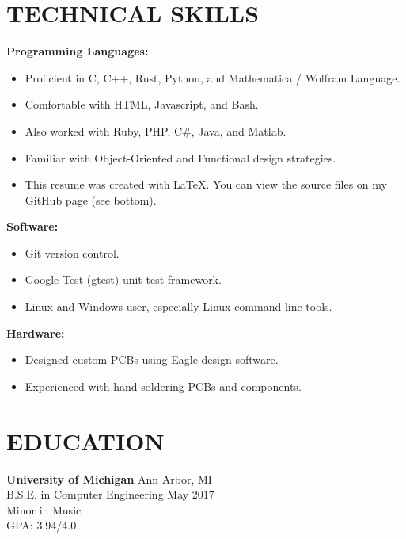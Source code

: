 \documentclass[margin,11pt]{res}
\begin{document}
\begin{resume}
\section{TECHNICAL SKILLS}
\textbf{Programming Languages:}\\
\vspace{-10pt}
\begin{itemize}
    \itemsep -2pt
    \item Proficient in C, C++, Rust, Python, and Mathematica / Wolfram Language.
    \item Comfortable with HTML, Javascript, and Bash.
    \item Also worked with Ruby, PHP, C\#, Java, and Matlab.
    \item Familiar with Object-Oriented and Functional design strategies.
    \item This resume was created with LaTeX.
          You can view the source files on my GitHub page (see bottom).
\end{itemize}

\vspace{-10pt}
\textbf{Software:}
\begin{itemize}
    \itemsep -2pt
    \item Git version control.
    \item Google Test (gtest) unit test framework.
    \item Linux and Windows user, especially Linux command line tools.
\end{itemize}

\vspace{-10pt}
\textbf{Hardware:}
\begin{itemize}
    \itemsep -2pt
    \item Designed custom PCBs using Eagle design software.
    \item Experienced with hand soldering PCBs and components.
\end{itemize}

\vspace{-10pt}
\section{EDUCATION}
\textbf{University of Michigan} \hfill Ann Arbor, MI\\
B.S.E. in Computer Engineering \hfill May 2017\\
Minor in Music\\
GPA: 3.94/4.0\\
\vspace{-24pt}


\end{resume}
\end{document}
